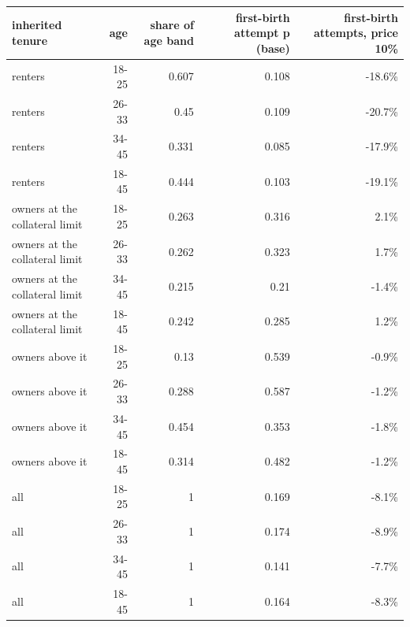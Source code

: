 \begin{tabular}{lrrrr}
\toprule
inherited tenure & age & share of age band & first-birth attempt p (base) & first-birth attempts, price 10\% \\
\midrule
renters & 18-25 & 0.607 & 0.108 & -18.6\% \\
renters & 26-33 & 0.45 & 0.109 & -20.7\% \\
renters & 34-45 & 0.331 & 0.085 & -17.9\% \\
renters & 18-45 & 0.444 & 0.103 & -19.1\% \\
owners at the collateral limit & 18-25 & 0.263 & 0.316 & 2.1\% \\
owners at the collateral limit & 26-33 & 0.262 & 0.323 & 1.7\% \\
owners at the collateral limit & 34-45 & 0.215 & 0.21 & -1.4\% \\
owners at the collateral limit & 18-45 & 0.242 & 0.285 & 1.2\% \\
owners above it & 18-25 & 0.13 & 0.539 & -0.9\% \\
owners above it & 26-33 & 0.288 & 0.587 & -1.2\% \\
owners above it & 34-45 & 0.454 & 0.353 & -1.8\% \\
owners above it & 18-45 & 0.314 & 0.482 & -1.2\% \\
all & 18-25 & 1 & 0.169 & -8.1\% \\
all & 26-33 & 1 & 0.174 & -8.9\% \\
all & 34-45 & 1 & 0.141 & -7.7\% \\
all & 18-45 & 1 & 0.164 & -8.3\% \\
\bottomrule
\end{tabular}
